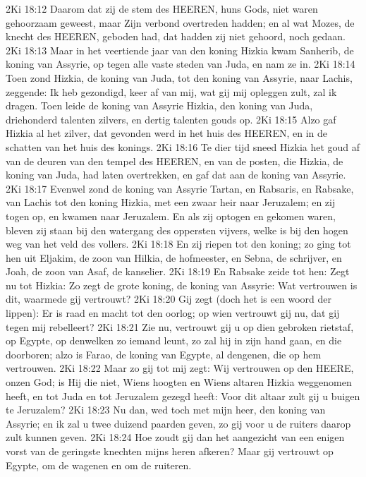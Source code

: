 2Ki 18:12  Daarom dat zij de stem des HEEREN, huns Gods, niet waren gehoorzaam geweest, maar Zijn verbond overtreden hadden; en al wat Mozes, de knecht des HEEREN, geboden had, dat hadden zij niet gehoord, noch gedaan.
2Ki 18:13  Maar in het veertiende jaar van den koning Hizkia kwam Sanherib, de koning van Assyrie, op tegen alle vaste steden van Juda, en nam ze in.
2Ki 18:14  Toen zond Hizkia, de koning van Juda, tot den koning van Assyrie, naar Lachis, zeggende: Ik heb gezondigd, keer af van mij, wat gij mij opleggen zult, zal ik dragen. Toen leide de koning van Assyrie Hizkia, den koning van Juda, driehonderd talenten zilvers, en dertig talenten gouds op.
2Ki 18:15  Alzo gaf Hizkia al het zilver, dat gevonden werd in het huis des HEEREN, en in de schatten van het huis des konings.
2Ki 18:16  Te dier tijd sneed Hizkia het goud af van de deuren van den tempel des HEEREN, en van de posten, die Hizkia, de koning van Juda, had laten overtrekken, en gaf dat aan de koning van Assyrie.
2Ki 18:17  Evenwel zond de koning van Assyrie Tartan, en Rabsaris, en Rabsake, van Lachis tot den koning Hizkia, met een zwaar heir naar Jeruzalem; en zij togen op, en kwamen naar Jeruzalem. En als zij optogen en gekomen waren, bleven zij staan bij den watergang des oppersten vijvers, welke is bij den hogen weg van het veld des vollers.
2Ki 18:18  En zij riepen tot den koning; zo ging tot hen uit Eljakim, de zoon van Hilkia, de hofmeester, en Sebna, de schrijver, en Joah, de zoon van Asaf, de kanselier.
2Ki 18:19  En Rabsake zeide tot hen: Zegt nu tot Hizkia: Zo zegt de grote koning, de koning van Assyrie: Wat vertrouwen is dit, waarmede gij vertrouwt?
2Ki 18:20  Gij zegt (doch het is een woord der lippen): Er is raad en macht tot den oorlog; op wien vertrouwt gij nu, dat gij tegen mij rebelleert?
2Ki 18:21  Zie nu, vertrouwt gij u op dien gebroken rietstaf, op Egypte, op denwelken zo iemand leunt, zo zal hij in zijn hand gaan, en die doorboren; alzo is Farao, de koning van Egypte, al dengenen, die op hem vertrouwen.
2Ki 18:22  Maar zo gij tot mij zegt: Wij vertrouwen op den HEERE, onzen God; is Hij die niet, Wiens hoogten en Wiens altaren Hizkia weggenomen heeft, en tot Juda en tot Jeruzalem gezegd heeft: Voor dit altaar zult gij u buigen te Jeruzalem?
2Ki 18:23  Nu dan, wed toch met mijn heer, den koning van Assyrie; en ik zal u twee duizend paarden geven, zo gij voor u de ruiters daarop zult kunnen geven.
2Ki 18:24  Hoe zoudt gij dan het aangezicht van een enigen vorst van de geringste knechten mijns heren afkeren? Maar gij vertrouwt op Egypte, om de wagenen en om de ruiteren.
